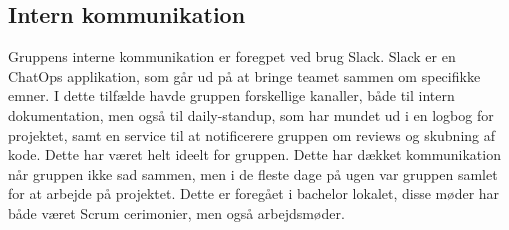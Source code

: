 \subsection{Intern kommunikation}

Gruppens interne kommunikation er foregpet ved brug Slack. Slack er en ChatOps applikation, som går ud på at bringe teamet sammen om specifikke emner. I dette tilfælde havde gruppen forskellige kanaller, både til intern dokumentation, men også til daily-standup, som har mundet ud i en logbog for projektet, samt en service til at notificerere gruppen om reviews og skubning af kode. Dette har været helt ideelt for gruppen. Dette har dækket kommunikation når gruppen ikke sad sammen, men i de fleste dage på ugen var gruppen samlet for at arbejde på projektet. Dette er foregået i bachelor lokalet, disse møder har både været Scrum cerimonier, men også arbejdsmøder.